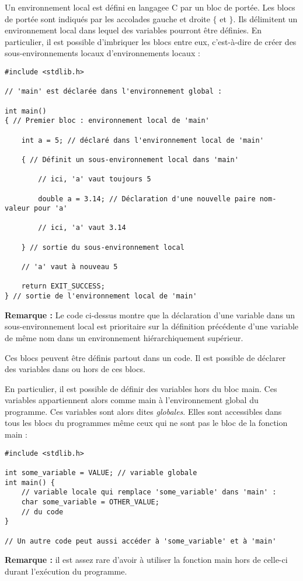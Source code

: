 \documentclass[../../../main.tex]{subfiles}
\begin{document}
Un environnement local est défini en langagee C par un bloc de portée. Les blocs de portée sont indiqués par les accolades gauche et droite $\{$ et $\}$. Ils délimitent un environnement local dans lequel des variables pourront être définies. En particulier, il est possible d'imbriquer les blocs entre eux, c'est-à-dire de créer des sous-environnements locaux d'environnements locaux :
\begin{verbatim}
#include <stdlib.h>

// 'main' est déclarée dans l'environnement global :

int main()
{ // Premier bloc : environnement local de 'main'

	int a = 5; // déclaré dans l'environnement local de 'main'

	{ // Définit un sous-environnement local dans 'main'

		// ici, 'a' vaut toujours 5
		
		double a = 3.14; // Déclaration d'une nouvelle paire nom-valeur pour 'a'
		
		// ici, 'a' vaut 3.14
	
	} // sortie du sous-environnement local

	// 'a' vaut à nouveau 5
	
	return EXIT_SUCCESS;
} // sortie de l'environnement local de 'main'

\end{verbatim}
\textbf{Remarque :} Le code ci-dessus montre que la déclaration d'une variable dans un sous-environnement local est prioritaire sur la définition précédente d'une variable de même nom dans un environnement hiérarchiquement supérieur.

Ces blocs peuvent être définis partout dans un code. Il est possible de déclarer des variables dans ou hors de ces blocs.
 
En particulier, il est possible de définir des variables hors du bloc \textsf{main}. Ces variables appartiennent alors comme \textsf{main} à l'environnement global du programme. Ces variables sont alors dites \textit{globales}. Elles sont accessibles dans tous les blocs du programmes même ceux qui ne sont pas le bloc de la fonction \textsf{main} :
\begin{verbatim}
#include <stdlib.h>

int some_variable = VALUE; // variable globale
int main() {
	// variable locale qui remplace 'some_variable' dans 'main' :
	char some_variable = OTHER_VALUE;
	// du code
}

// Un autre code peut aussi accéder à 'some_variable' et à 'main'
\end{verbatim}
\textbf{Remarque :} il est assez rare d'avoir à utiliser la fonction \textsf{main} hors de celle-ci durant l'exécution du programme.
\end{document}
